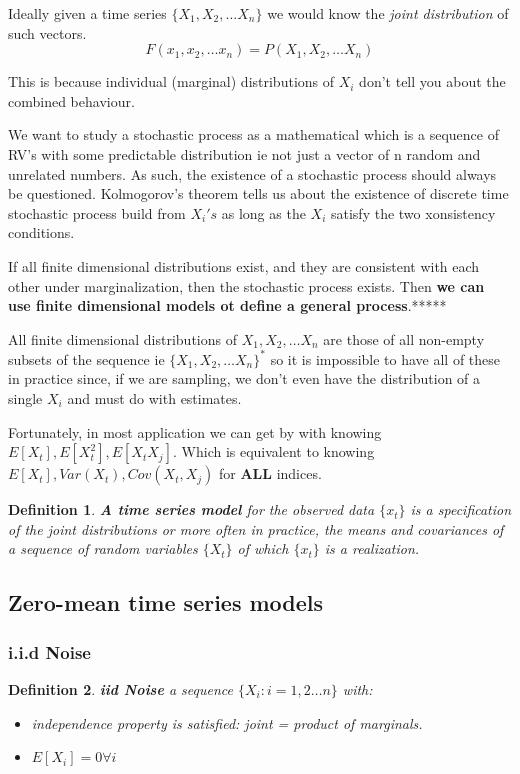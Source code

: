 \documentclass{article}
\newtheorem{definition}{Definition}
\begin{document}
Ideally given a time series $\{X_1, X_2, ... X_n\}$ we would know the \textit{joint distribution} of such vectors. 
\[ F(x_1, x_2, \dots x_n) = P(X_1, X_2, \dots X_n)\]

This is because individual (marginal) distributions of $X_i$ don't tell you about the combined behaviour.

We want to study a stochastic process as a mathematical which is a sequence of RV's with some predictable distribution ie not just a vector of n random and unrelated numbers. As such, the existence of a stochastic process should always be questioned. Kolmogorov's theorem tells us about the existence of  discrete time stochastic process build from $X_i's$ as long as the $X_i$ satisfy the two xonsistency conditions. 

If all finite dimensional distributions exist, and they are consistent with each other under marginalization, then the stochastic process exists.  Then \textbf{we can use finite dimensional models ot define a general process}.*****

All finite dimensional distributions of $X_1, X_2, \dots X_n$ are those of all non-empty subsets of the sequence ie $\{ X_1, X_2, \dots X_n \}^*$ so it is impossible to have all of these in practice since, if we are sampling, we don't even have the distribution of a single $X_i$ and must do with estimates. 

Fortunately, in most application we can get by with knowing $E[X_t], E[X_t^2], E[X_tX_j]$. Which is equivalent to knowing $E[X_t], Var(X_t), Cov(X_t, X_j)$ for \textbf{ALL} indices.

\begin{definition}
\textbf{A time series model} for the observed data $\{x_t\}$ is a specification of the joint distributions or more often in practice, the means and covariances of a sequence of random variables $\{X_t\}$ of which $\{x_t\}$ is a realization. 
\end{definition}


\subsection{Zero-mean time series models}
\subsubsection{i.i.d Noise}
\begin{definition}
\textbf{iid Noise} a sequence $\{X_i : i = 1,2\dots n\}$ with: 
\begin{itemize}
\item  independence property is satisfied: joint = product of marginals.
\item  $E[X_i] = 0 \forall i$

\end{itemize} 
\end{definition}
\end{document}

